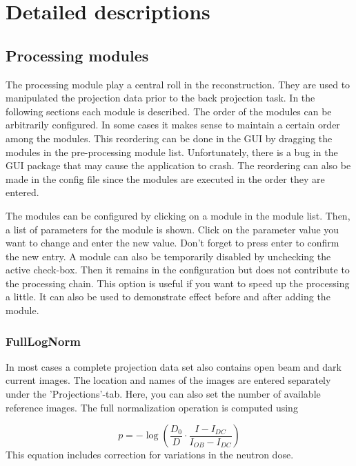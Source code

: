 \documentclass[a4paper]{scrreprt}
\begin{document}
\chapter{Detailed descriptions}
\section{Processing modules}
The processing module play a central roll in the reconstruction. They are used to manipulated the projection data prior to the back projection task. In the following sections each module is described. The order of the modules can be arbitrarily configured. In some cases it makes sense to maintain a certain order among the modules. This reordering can be done in the GUI by dragging the modules in the pre-processing module list. Unfortunately, there is a bug in the
GUI package that may cause the application to crash. The reordering can also be made in the config file since the modules are executed in the order they are entered.

The modules can be configured by clicking on a module in the module list. Then, a list of parameters for the module is shown. Click on the parameter value you want to change and enter the new value. Don't forget to press enter to confirm
the new entry. A module can also be temporarily disabled by unchecking the active check-box. Then it remains in the configuration but does not contribute to the processing chain. This option is useful if you want to speed up the processing a little. It can also be used to demonstrate effect before and after adding the module.

\subsection{FullLogNorm}
In most cases a complete projection data set also contains open beam and dark current images. The location and names of the images are entered separately under the 'Projections'-tab. Here, you can also set the number of available reference images. The full normalization operation is computed using

\begin{equation}
p=-\log\left(\frac{D_0}{D}\cdot\frac{I-I_{DC}}{I_{OB}-I_{DC}}\right)
\end{equation}
This equation includes correction for variations in the neutron dose.
\end{document}
